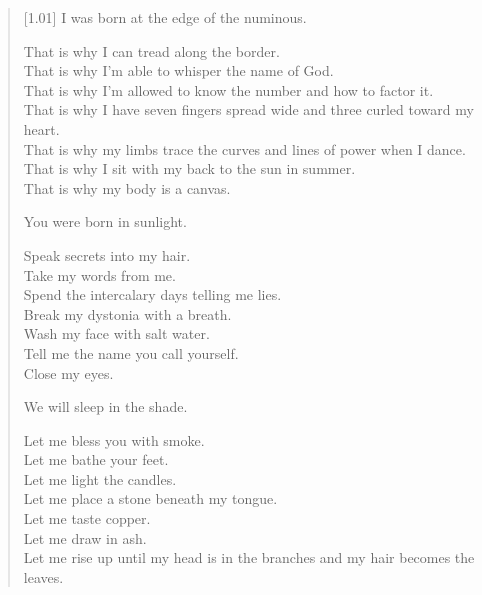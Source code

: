 \begin{verse}[1.01\textwidth]
    I was born at the edge of the numinous.

    That is why I can tread along the border.\\
    That is why I'm able to whisper the name of God.\\
    That is why I'm allowed to know the number and how to factor it.\\
    That is why I have seven fingers spread wide and three curled toward my heart.\\
    That is why my limbs trace the curves and lines of power when I dance.\\
    That is why I sit with my back to the sun in summer.\\
    That is why my body is a canvas.

    You were born in sunlight.

    Speak secrets into my hair.\\
    Take my words from me.\\
    Spend the intercalary days telling me lies.\\
    Break my dystonia with a breath.\\
    Wash my face with salt water.\\
    Tell me the name you call yourself.\\
    Close my eyes.

    We will sleep in the shade.

    Let me bless you with smoke.\\
    Let me bathe your feet.\\
    Let me light the candles.\\
    Let me place a stone beneath my tongue.\\
    Let me taste copper.\\
    Let me draw in ash.\\
    Let me rise up until my head is in the branches and my hair becomes the leaves.
\end{verse}
\newpage

